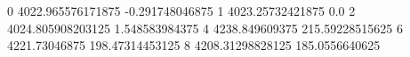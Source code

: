 0 4022.965576171875 -0.291748046875
1 4023.25732421875 0.0
2 4024.805908203125 1.548583984375
4 4238.849609375 215.59228515625
6 4221.73046875 198.47314453125
8 4208.31298828125 185.0556640625
